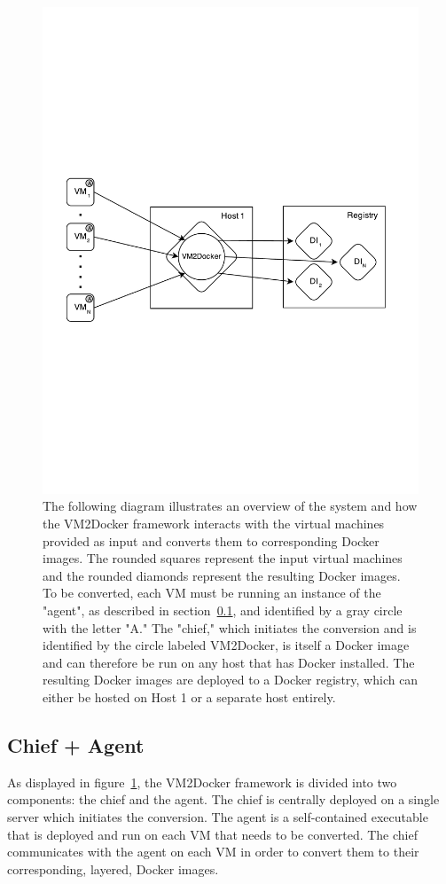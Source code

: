 \begin{figure}[h]
\centering
    \includegraphics[width=1.0\textwidth]{system2.pdf}
    \caption{The following diagram illustrates an overview of the system and how the VM2Docker framework interacts with the virtual machines provided as input and converts them to corresponding Docker images. The rounded squares represent the input virtual machines and the rounded diamonds represent the resulting Docker images. To be converted, each VM must be running an instance of the "agent", as described in section~\ref{sec:agent}, and identified by a gray circle with the letter "A." The "chief," which initiates the conversion and is identified by the circle labeled VM2Docker, is itself a Docker image and can therefore be run on any host that has Docker installed. The resulting Docker images are deployed to a Docker registry, which can either be hosted on Host 1 or a separate host entirely. }
   \label{fig:sys}
\end{figure}
\subsection{Chief + Agent}
\label{sec:agent}
As displayed in figure~\ref{fig:sys}, the VM2Docker framework is divided into two components: the chief and the agent. The chief is centrally deployed on a single server which initiates the conversion. The agent is a self-contained executable that is deployed and run on each VM that needs to be converted. The chief communicates with the agent on each VM in order to convert them to their corresponding, layered, Docker images.  

